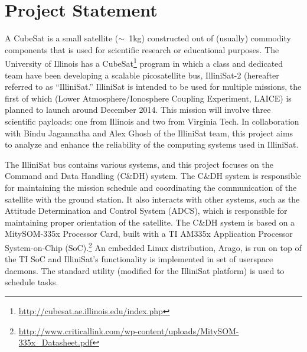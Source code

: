 \section{Project Statement}\label{sec:problem}

A CubeSat is a small satellite ($\sim$~1kg) constructed out of (usually)
commodity components that is used for scientific research or educational
purposes.  The University of Illinois has a
CubeSat\footnote{\url{http://cubesat.ae.illinois.edu/index.php}} program in
which a class and dedicated team have been developing a scalable picosatellite
bus, IlliniSat-2 (hereafter referred to as ``IlliniSat.''  IlliniSat is intended
to be used for multiple missions, the first of which (Lower
Atmosphere/Ionosphere Coupling Experiment, LAICE) is planned to launch around
December 2014.  This mission will involve three scientific payloads: one from
Illinois and two from Virginia Tech.  In collaboration with Bindu Jagannatha and
Alex Ghosh of the IlliniSat team, this project aims to analyze and enhance the
reliability of the computing systems used in IlliniSat.

The IlliniSat bus contains various systems, and this project focuses on the
Command and Data Handling (C\&DH) system.  The C\&DH system is responsible for
maintaining the mission schedule and coordinating the communication of the
satellite with the ground station.  It also interacts with other systems, such
as the Attitude Determination and Control System (ADCS), which is responsible
for maintaining proper orientation of the satellite. 
The C\&DH system is based on a MitySOM-335x Processor
Card, built with a TI AM335x Application Processor System-on-Chip
(SoC).\footnote{\url{http://www.criticallink.com/wp-content/uploads/MitySOM-335x_Datasheet.pdf}}
An embedded Linux distribution, Arago, is run on top of the TI SoC and
IlliniSat's functionality is implemented in set of userspace daemons. The
standard  utility (modified for the IlliniSat platform) is used to
schedule tasks.

